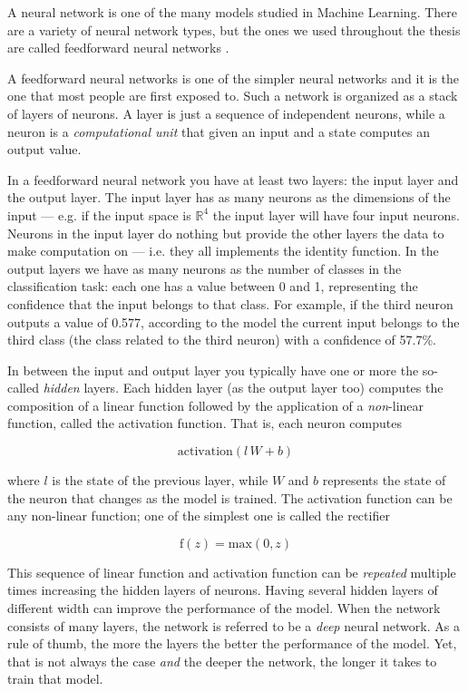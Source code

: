 A neural network is one of the many models studied in Machine Learning.
There are a variety of neural network types, but the ones we used
throughout the thesis are called feedforward neural
networks \cite{Goodfellow-et-al-2016}.

A feedforward neural networks is one of the simpler neural networks and
it is the one that most people are first exposed to. Such a network is
organized as a stack of layers of neurons. A layer is just a sequence
of independent neurons, while a neuron is a \emph{computational unit}
that given an input and a state computes an output value.

In a feedforward neural network you have at least two layers: the input
layer and the output layer. The input layer has as many neurons as the
dimensions of the input --- e.g. if the input space is $\mathbb{R}^4$
the input layer will have four input neurons. Neurons in the input
layer do nothing but provide the other layers the data to make
computation on --- i.e. they all implements the identity function.
In the output layers we have as many neurons as the number of
classes in the classification task: each one has a value between 0 and
1, representing the confidence that the input belongs to that class.
For example, if the third neuron outputs a value of 0.577, according to
the model the current input belongs to the third class (the class
related to the third neuron) with a confidence of 57.7\%.

In between the input and output layer you typically have one or more
the so-called \emph{hidden} layers. Each hidden layer (as the output
layer too) computes the composition of a linear function followed by
the application of a \emph{non}-linear function, called the activation
function. That is, each neuron computes

\[ \text{activation}(l \, W + b) \]

where $l$ is the state of the previous layer, while $W$ and $b$
represents the state of the neuron that changes as the model is
trained. The activation function can be any non-linear function; one of
the simplest one is called the rectifier

\[ \text{f}(z) = \text{max}(0, z) \]

This sequence of linear function and activation function can be
\emph{repeated} multiple times increasing the hidden layers of neurons.
Having several hidden layers of different width can improve the
performance of the model. When the network consists of many layers, the
network is referred to be a \emph{deep} neural network. As a rule of
thumb, the more the layers the better the performance of the model.
Yet, that is not always the case \emph{and} the deeper the network, the
longer it takes to train that model.

